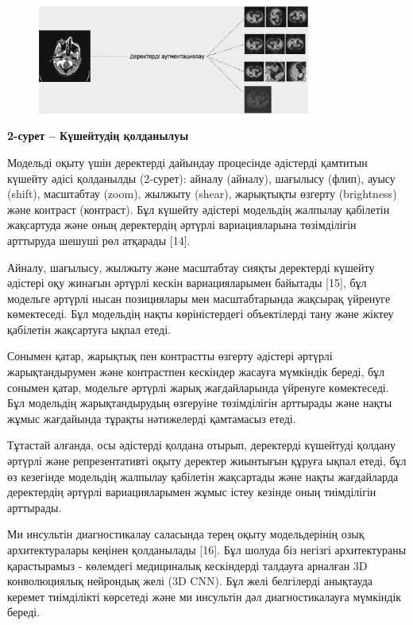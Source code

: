 \begin{figure}[H]
	\centering
	\includegraphics[width=0.8\textwidth]{assets/2}
	\caption*{}
\end{figure}

\textbf{2-сурет -- Күшейтудің қолданылуы}

Модельді оқыту үшін деректерді дайындау процесінде әдістерді қамтитын
күшейту әдісі қолданылды (2-сурет): айналу (айналу), шағылысу (флип),
ауысу (shift), масштабтау (zoom), жылжыту (shear), жарықтықты өзгерту
(brightness) және контраст (контраст). Бұл күшейту әдістері модельдің
жалпылау қабілетін жақсартуда және оның деректердің әртүрлі
вариацияларына төзімділігін арттыруда шешуші рөл атқарады {[}14{]}.

Айналу, шағылысу, жылжыту және масштабтау сияқты деректерді күшейту
әдістері оқу жинағын әртүрлі кескін вариацияларымен байытады {[}15{]},
бұл модельге әртүрлі нысан позициялары мен масштабтарында жақсырақ
үйренуге көмектеседі. Бұл модельдің нақты көріністердегі объектілерді
тану және жіктеу қабілетін жақсартуға ықпал етеді.

Сонымен қатар, жарықтық пен контрастты өзгерту әдістері әртүрлі
жарықтандырумен және контрастпен кескіндер жасауға мүмкіндік береді, бұл
сонымен қатар, модельге әртүрлі жарық жағдайларында үйренуге
көмектеседі. Бұл модельдің жарықтандырудың өзгеруіне төзімділігін
арттырады және нақты жұмыс жағдайында тұрақты нәтижелерді қамтамасыз
етеді.

Тұтастай алғанда, осы әдістерді қолдана отырып, деректерді күшейтуді
қолдану әртүрлі және репрезентативті оқыту деректер жиынтығын құруға
ықпал етеді, бұл өз кезегінде модельдің жалпылау қабілетін жақсартады
және нақты жағдайларда деректердің әртүрлі вариацияларымен жұмыс істеу
кезінде оның тиімділігін арттырады.

Ми инсультін диагностикалау саласында терең оқыту модельдерінің озық
архитектуралары кеңінен қолданылады {[}16{]}. Бұл шолуда біз негізгі
архитектураны қарастырамыз - көлемдегі медициналық кескіндерді талдауға
арналған 3D конволюциялық нейрондық желі (3D CNN). Бұл желі белгілерді
анықтауда керемет тиімділікті көрсетеді және ми инсультін дәл
диагностикалауға мүмкіндік береді.

